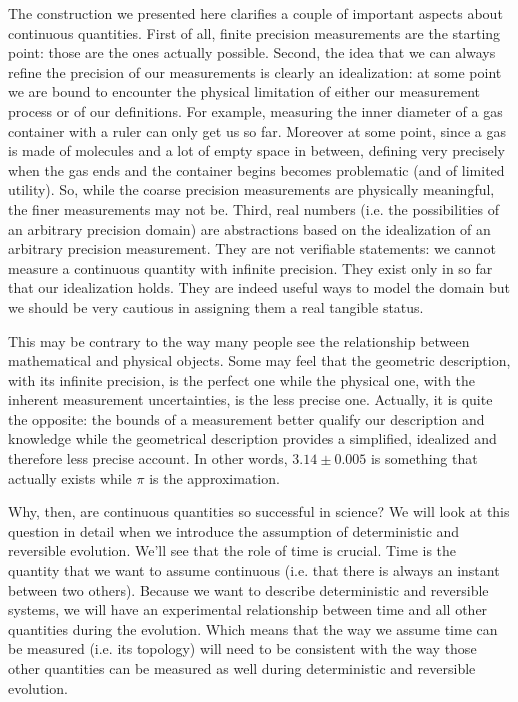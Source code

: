 \documentclass[11pt,letterpaper,fleqn]{memoir} %
\begin{document}
The construction we presented here clarifies a couple of important aspects about continuous quantities. First of all, finite precision measurements are the starting point: those are the ones actually possible. Second, the idea that we can always refine the precision of our measurements is clearly an idealization: at some point we are bound to encounter the physical limitation of either our measurement process or of our definitions. For example, measuring the inner diameter of a gas container with a ruler can only get us so far. Moreover at some point, since a gas is made of molecules and a lot of empty space in between, defining very precisely when the gas ends and the container begins becomes problematic (and of limited utility). So, while the coarse precision measurements are physically meaningful, the finer measurements may not be. Third, real numbers (i.e. the possibilities of an arbitrary precision domain) are abstractions based on the idealization of an arbitrary precision measurement. They are not verifiable statements: we cannot measure a continuous quantity with infinite precision. They exist only in so far that our idealization holds. They are indeed useful ways to model the domain but we should be very cautious in assigning them a real tangible status.

This may be contrary to the way many people see the relationship between mathematical and physical objects. Some may feel that the geometric description, with its infinite precision, is the perfect one while the physical one, with the inherent measurement uncertainties, is the less precise one. Actually, it is quite the opposite: the bounds of a measurement better qualify our description and knowledge while the geometrical description provides a simplified, idealized and therefore less precise account. In other words, $3.14 \pm 0.005$ is something that actually exists while $\pi$ is the approximation.

Why, then, are continuous quantities so successful in science? We will look at this question in detail when we introduce the assumption of deterministic and reversible evolution. We'll see that the role of time is crucial. Time is the quantity that we want to assume continuous (i.e. that there is always an instant between two others). Because we want to describe deterministic and reversible systems, we will have an experimental relationship between time and all other quantities during the evolution. Which means that the way we assume time can be measured (i.e. its topology) will need to be consistent with the way those other quantities can be measured as well during deterministic and reversible evolution.
\end{document}
